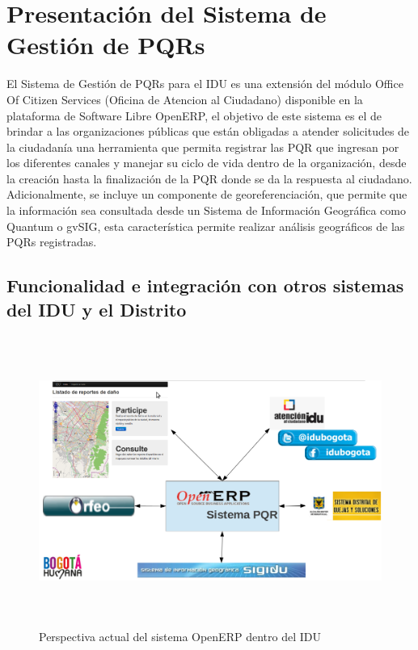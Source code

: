 \section{Presentación del Sistema de Gestión de PQRs}

El Sistema de Gestión de PQRs para el IDU es una extensión del módulo Office Of Citizen Services (Oficina de Atencion al Ciudadano) disponible 
en la plataforma de Software Libre OpenERP, 
el objetivo de este sistema es el de brindar a las organizaciones públicas que están obligadas a 
atender solicitudes de la ciudadanía una herramienta que permita registrar las PQR que ingresan por los diferentes canales y manejar su ciclo de vida
dentro de la organización, desde la creación hasta la finalización de la PQR donde se da la respuesta al ciudadano.\\
Adicionalmente, se incluye un componente de georeferenciación, que permite que la información 
sea consultada desde un Sistema de Información Geográfica como Quantum o gvSIG, esta característica permite realizar análisis geográficos de las PQRs registradas.\\

\subsection{Funcionalidad e integración con otros sistemas del IDU y el Distrito}

\begin{figure}[h]
 \centering
 \includegraphics[width=17cm,height=9.5cm]{./Imagenes/slidesistemacompleto.png}
 \caption{Perspectiva actual del sistema OpenERP dentro del IDU}
 \label{fig:slidesistemacompleto}
\end{figure}

